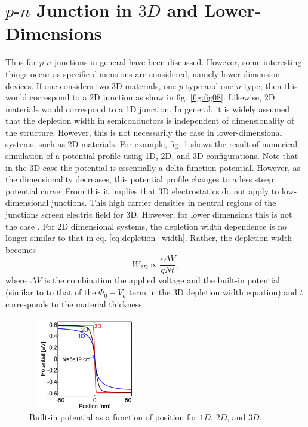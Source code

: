 \section{$p$-$n$ Junction in $3D$ and Lower-Dimensions}\label{sec:sec004}
Thus far $p$-$n$ junctions in general have been discussed. However, some interesting things occur as specific
dimensions are considered, namely lower-dimension devices. If one considers two 3D materials, one $p$-type and one $n$-type, then this would
correspond to a 2D junction as show in fig. \ref{fig:fig08}. Likewise, 2D materials would correspond to a 1D junction. In general, it is widely assumed that the depletion width in 
semiconductors is independent of dimensionality of the structure. However, this is not necessarily the case in lower-dimensional systems, such as 2D materials.
For example, fig. \ref{fig:fig09} shows the result of numerical simulation of a potential profile using 1D, 2D, and 3D configurations. Note that in the 3D case
the potential is essentially a delta-function potential. However, as the dimensionality decreases, this potential profile changes to a less steep potential curve.
From this it implies that 3D electrostatics do not apply to low-dimensional junctions. This high carrier densities in neutral regions of the junctions screen electric field for 3D.
However, for lower dimensions this is not the case \cite{Ilatikhameneh2016}. For 2D dimensional systems, the depletion width dependence is no longer similar to 
that in eq. \ref{eq:depletion_width}. Rather, the depletion width becomes
\begin{equation}\label{eq:wd_2d}
    W_{2D}\propto \frac{\epsilon \Delta V}{qNt},
\end{equation}
where $\Delta V$ is the combination the applied voltage and the built-in potential (similar to to that of the $\Phi_0 - V_a$ term in the 3D depletion width equation) and $t$ corresponds to
the material thickness \cite{Ilatikhameneh2017}. 
\begin{figure}[h!]\label{fig:fig09}
    \centering
    \includegraphics[height=4cm,width=5cm]{figs/2d_3d}
    \caption{Built-in potential as a function of position for $1D$, $2D$, and $3D$.}
\end{figure}
